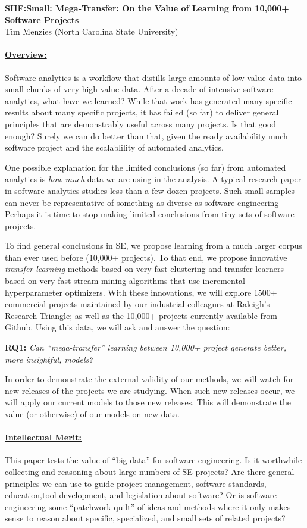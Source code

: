 \documentclass[10pt,letterpaper]{article}
\newcommand\myTitle{\newpage
\begin{center}
{\bf SHF:Small: Mega-Transfer: On the Value of Learning from 10,000+ Software Projects}\\
Tim Menzies (North Carolina State University)
\end{center}}
\newcommand\head[1]{\paragraph{\underline{#1}}}
\begin{document}
\pagestyle{plain}
\myTitle
\pagestyle{empty}

\head{Overview:}
Software analytics is a workflow that distills large amounts of low-value data into small chunks of very high-value data. 
After a decade of intensive software analytics, what have we learned? While that work has generated many specific results about many specific projects,
it has failed (so far) to deliver general principles that are demonstrably useful across many projects. 
Is that good enough? Surely we can do better than that,  given the ready availability much software project and  the scalablility of automated analytics.

One possible explanation for the limited conclusions (so far) from automated analytics is  {\em how much} data we are using in the analysis. 
A typical research paper in software analytics studies less than a few dozen projects.  Such small samples can never be
representative of something as diverse as software engineering
Perhaps it is   time to stop making 
limited conclusions from tiny sets of 
software projects.


To find general conclusions in SE, we propose learning from a much larger corpus than ever used before (10,000+ projects). To that end,
we propose  innovative {\em transfer learning}
methods based on  very fast clustering and transfer learners based on very fast stream mining algorithms that use incremental hyperparameter optimizers.  With these innovations, we will explore
1500+ commercial projects maintained by our industrial colleagues at Raleigh's Research Triangle;
as well as the 10,000+ projects currently available from Github.
Using this data, we  will ask and answer the question:
\begin{center}
{\bf RQ1:} {\em Can ``mega-transfer'' learning  between 10,000+ project generate better, more insightful, models?}
\end{center}
In order to demonstrate the external validity of our methods, we will watch for new releases of the projects we are studying. When such new releases occur, we will apply our current models to those new releases. This will demonstrate the value (or otherwise) of our models on new data.


\head{Intellectual Merit:} 
This paper tests the value of ``big data'' for software engineering. Is it worthwhile collecting and reasoning about large numbers of SE projects? 
Are there general principles we can use to guide project management, software standards, education,tool development, and legislation about software? Or is software engineering some ``patchwork quilt'' of ideas and methods where it only makes sense to reason about specific, specialized, and small sets of related projects?
\end{document}
